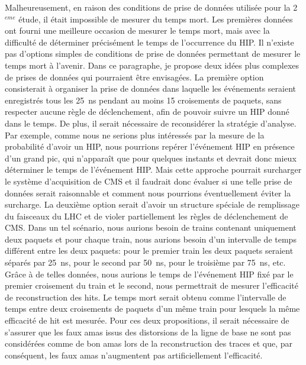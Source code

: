 Malheureusement, en raison des conditions de prise de données utilisée pour la 2$^{eme}$ étude, il était impossible de mesurer du temps mort. Les premières données ont fourni une meilleure occasion de mesurer le temps mort, mais avec la difficulté de déterminer précisément le temps de l'occurrence du HIP. Il n’existe pas d’options simples de conditions de prise de données permettant de mesurer le temps mort à l’avenir. Dans ce paragraphe, je propose deux idées plus complexes de prises de données qui pourraient être envisagées. La première option consisterait à organiser la prise de données dans laquelle les événements seraient enregistrés tous les 25~ns pendant au moins 15 croisements de paquets, sans respecter aucune règle de déclenchement, afin de pouvoir suivre un HIP donné dans le temps. De plus, il serait nécessaire de reconsidérer la stratégie d’analyse. Par exemple, comme nous ne serions plus intéressés par la mesure de la probabilité d'avoir un HIP, nous pourrions repérer l’événement HIP en présence d’un grand pic, qui n’apparaît que pour quelques instants et devrait donc mieux déterminer le temps de l’événement HIP. Mais cette approche pourrait surcharger le système d'acquisition de CMS et il faudrait donc évaluer si une telle prise de données serait raisonnable et comment nous pourrions éventuellement éviter la surcharge. La deuxième option serait d'avoir un structure spéciale de remplissage du faisceaux du LHC et de violer partiellement les règles de déclenchement de CMS. Dans un tel scénario, nous aurions besoin de trains contenant uniquement deux paquets et pour chaque train, nous aurions besoin d'un intervalle de temps différent entre les deux paquets: pour le premier train les deux paquets seraient séparés par 25~ns, pour le second par 50~ns, pour le troisième par 75~ns, etc. Grâce à de telles données, nous aurions le temps de l'événement HIP fixé par le premier croisement du train et le second, nous permettrait de mesurer l'efficacité de reconstruction des hits. Le temps mort serait obtenu  comme l'intervalle de temps entre deux croisements de paquets d'un  même train pour lesquels la même efficacité de hit est mesurée. Pour ces deux propositions, il serait nécessaire de s'assurer que les faux amas issus des distorsions de la ligne de base ne sont pas considérées comme de bon amas lors de la reconstruction  des traces et que, par conséquent, les faux amas n'augmentent pas artificiellement l'efficacité.


